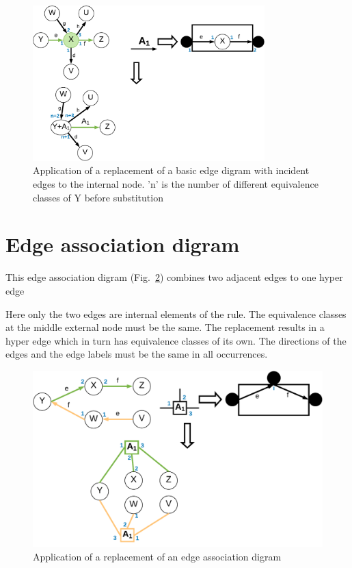 \begin{figure}[h]
	\centering
	\includegraphics[width=0.8\textwidth]{chapters/imgConcept/edgeDigram_extern}
	\caption{Application of a replacement of a basic edge digram with incident edges to the internal node. 'n' is the number of different equivalence classes of Y before substitution}
	\label{fig:incedentEdges2}
\end{figure}

\section{Edge association digram}
\label{sec:edgeAssociationDigram}


This edge association digram (Fig.~\ref{fig:edgeAssociationDigram}) combines two adjacent edges to one hyper edge

Here only the two edges are internal elements of the rule. The equivalence classes at the middle external node must be the same. The replacement results in a hyper edge which in turn has equivalence classes of its own. The directions of the edges and the edge labels must be the same in all occurrences.
\begin{figure}[h]
	\centering
	\includegraphics[width=1\textwidth]{chapters/imgConcept/edgeAssociationDigram}
	\caption{Application of a replacement of an edge association digram}
	\label{fig:edgeAssociationDigram}
\end{figure}

